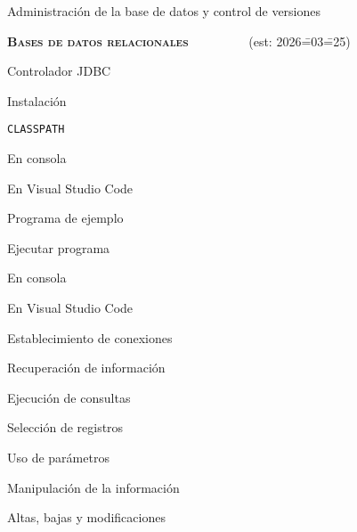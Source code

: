 \begin{longenum}
\begin{longenum}
\begin{longenum}
\begin{longenum}
                \item Administración de la base de datos y control de versiones
            \end{longenum}
        \end{longenum}
    \end{longenum}
    \item \textbf{\textsc{Bases de datos relacionales}} \ \ \ \ \ \ \ \ \ (est: 2026\==03\==25)
    \begin{longenum}
        \item Controlador JDBC
        \begin{longenum}
            \item Instalación
            \item \texttt{CLASSPATH}
            \begin{longenum}
                \item En consola
                \item En Visual Studio Code
            \end{longenum}
        \end{longenum}
        \item Programa de ejemplo
        \item Ejecutar programa
        \begin{longenum}
            \item En consola
            \item En Visual Studio Code
        \end{longenum}
        \item Establecimiento de conexiones
        \item Recuperación de información
        \begin{longenum}
            \item Ejecución de consultas
            \item Selección de registros
            \item Uso de parámetros
        \end{longenum}
        \item Manipulación de la información
        \begin{longenum}
            \item Altas, bajas y modificaciones
        \end{longenum}
    \end{longenum}
\end{longenum}
